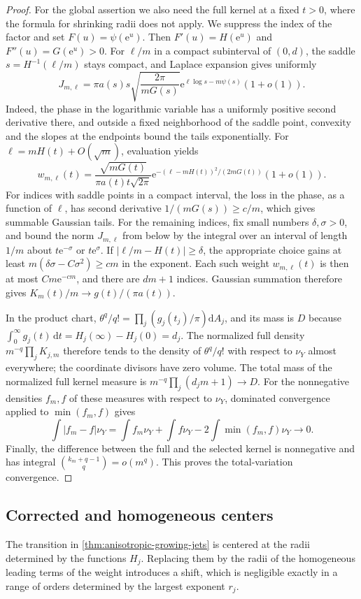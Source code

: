 \begin{proof}
For the global assertion we also need the full kernel at a fixed $t>0$, where the formula for shrinking radii does not apply. We suppress the index of the factor and set $F(u)=\psi(\mathrm e^u)$. Then $F'(u)=H(\mathrm e^u)$ and $F''(u)=G(\mathrm e^u)>0$. For $\ell/m$ in a compact subinterval of $(0,d)$, the saddle $s=H^{-1}(\ell/m)$ stays compact, and Laplace expansion gives uniformly
\[
 J_{m,\ell}=\pi a(s)s\sqrt{\frac{2\pi}{mG(s)}}
       \mathrm e^{\ell\log s-m\psi(s)}(1+o(1)).
\]
Indeed, the phase in the logarithmic variable has a uniformly positive second derivative there, and outside a fixed neighborhood of the saddle point, convexity and the slopes at the endpoints bound the tails exponentially. For $\ell=mH(t)+O(\sqrt m)$, evaluation yields
\[
 w_{m,\ell}(t)=\frac{\sqrt{mG(t)}}{\pi a(t)t\sqrt{2\pi}}
   \mathrm e^{-(\ell-mH(t))^2/(2mG(t))}(1+o(1)).
\]
For indices with saddle points in a compact interval, the loss in the phase, as a function of $\ell$, has second derivative $1/(mG(s))\geq c/m$, which gives summable Gaussian tails. For the remaining indices, fix small numbers $\delta,\sigma>0$, and bound the norm $J_{m,\ell}$ from below by the integral over an interval of length $1/m$ about $t\mathrm e^{-\sigma}$ or $t\mathrm e^{\sigma}$. If $|\ell/m-H(t)|\geq\delta$, the appropriate choice gains at least $m(\delta\sigma-C\sigma^2)\geq cm$ in the exponent. Each such weight $w_{m,\ell}(t)$ is then at most $Cm\mathrm e^{-cm}$, and there are $dm+1$ indices. Gaussian summation therefore gives $K_m(t)/m\to g(t)/(\pi a(t))$.

In the product chart, $\theta^q/q!=\prod_j(g_j(t_j)/\pi)\mathrm dA_j$, and its mass is $D$ because $\int_0^\infty g_j(t)\,\mathrm dt=H_j(\infty)-H_j(0)=d_j$. The normalized full density $m^{-q}\prod_jK_{j,m}$ therefore tends to the density of $\theta^q/q!$ with respect to $\nu_Y$ almost everywhere; the coordinate divisors have zero volume. The total mass of the normalized full kernel measure is $m^{-q}\prod_j(d_jm+1)\to D$. For the nonnegative densities $f_m,f$ of these measures with respect to $\nu_Y$, dominated convergence applied to $\min(f_m,f)$ gives
\[
 \int|f_m-f|\nu_Y
 =\int f_m\nu_Y+\int f\nu_Y-2\int\min(f_m,f)\nu_Y\longrightarrow0.
\]
Finally, the difference between the full and the selected kernel is nonnegative and has integral $\binom{k_m+q-1}{q}=o(m^q)$. This proves the total-variation convergence.
\end{proof}

\subsection{Corrected and homogeneous centers}
The transition in \cref{thm:anisotropic-growing-jets} is centered at the radii determined by the functions $H_j$. Replacing them by the radii of the homogeneous leading terms of the weight introduces a shift, which is negligible exactly in a range of orders determined by the largest exponent $r_j$.

